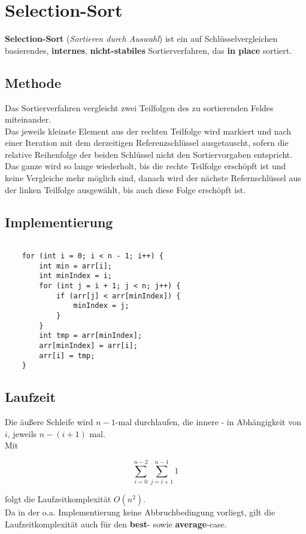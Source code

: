 \section{Selection-Sort}

\textbf{Selection-Sort} (\textit{Sortieren durch Auswahl}) ist ein auf Schlüsselvergleichen basierendes, \textbf{internes}, \textbf{nicht-stabiles} Sortierverfahren, das \textbf{in place} sortiert.

\subsection{Methode}
Das Sortierverfahren vergleicht zwei Teilfolgen des zu sortierenden Feldes miteinander.\\
Das jeweils kleinste Element aus der rechten Teilfolge wird markiert und nach einer Iteration mit dem derzeitigen Referenzschlüssel ausgetauscht, sofern die relative Reihenfolge der beiden Schlüssel nicht den Sortiervorgaben entspricht.\\
Das ganze wird so lange wiederholt, bis die rechte Teilfolge erschöpft ist und keine Vergleiche mehr möglich sind, danach wird der nächste Refernschlüssel aus der linken Teilfolge ausgewählt, bis auch diese Folge erschöpft ist.


\subsection{Implementierung}

\begin{verbatim}

    for (int i = 0; i < n - 1; i++) {
        int min = arr[i];
        int minIndex = i;
        for (int j = i + 1; j < n; j++) {
            if (arr[j] < arr[minIndex]) {
                minIndex = j;
            }
        }
        int tmp = arr[minIndex];
        arr[minIndex] = arr[i];
        arr[i] = tmp;
    }

\end{verbatim}


\subsection{Laufzeit}
Die äußere Schleife wird $n - 1$-mal durchlaufen, die innere - in Abhängigkeit von $i$, jeweils $n - (i + 1)$ mal.\\
Mit

\begin{equation}
    \sum_{i=0}^{n-2} \sum_{j = i + 1}^{n - 1} 1
\end{equation}

\noindent
folgt die Laufzeitkomplexität $O(n^2)$.\\

\noindent
Da in der o.a. Implementierung keine Abbruchbedingung vorliegt, gilt die Laufzeitkomplexität auch für den \textbf{best}- sowie \textbf{average}-case.

